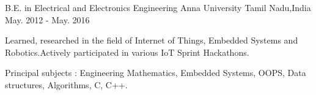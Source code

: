 \begin{cventries}
  \cventry
    {B.E. in Electrical and Electronics Engineering}
    {Anna University} 
    {Tamil Nadu,India}
    {May. 2012 - May. 2016}
    {
      \begin{cvitems}
        \item {Learned, researched in the field of Internet of Things, Embedded Systems and Robotics.Actively participated in various IoT Sprint Hackathons.}
        \item {Principal subjects : Engineering Mathematics, Embedded Systems, OOPS, Data structures, Algorithms, C, C++.}
      \end{cvitems}
    }
\end{cventries}
